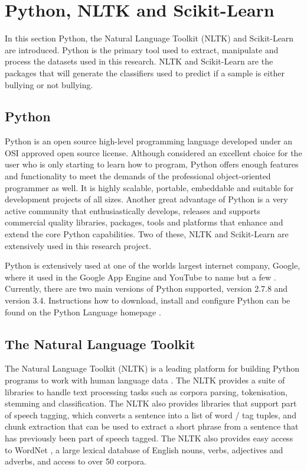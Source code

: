 \section{Python, NLTK and Scikit-Learn}
\label{section:2.2}

In this section Python, the Natural Language Toolkit (NLTK) and Scikit-Learn are introduced. Python is the primary tool used to extract, manipulate and process the datasets used in this research. NLTK and Scikit-Learn are the packages that will generate the classifiers used to predict if a sample is either bullying or not bullying.

\subsection{Python}

Python is an open source high-level programming language developed under an OSI approved open source license. Although considered an excellent choice for the user who is only starting to learn how to program, Python offers enough features and functionality to meet the demands of the professional object-oriented programmer as well. It is highly scalable, portable, embeddable and suitable for development projects of all sizes. Another great advantage of Python is a very active community that enthusiastically develops, releases and supports commercial quality libraries, packages, tools and platforms that enhance and extend the core Python capabilities. Two of these, NLTK and Scikit-Learn are extensively used in this research project. 

Python is extensively used at one of the worlds largest internet company, Google, where it used in the Google App Engine and YouTube to name but a few \cite{google_python}. Currently, there are two main versions of Python supported, version 2.7.8 and version 3.4. Instructions how to download, install and configure Python can be found on the Python Language homepage \cite{python}.

\subsection{The Natural Language Toolkit}

The Natural Language Toolkit (NLTK) is a leading platform for building Python programs to work with human language data \cite{nltk}. The NLTK provides a suite of libraries to handle text processing tasks such as corpora parsing, tokenisation, stemming and classification. The NLTK also provides libraries that support part of speech tagging, which converts a sentence into a list of word / tag tuples, and chunk extraction that can be used to extract a short phrase from a sentence that has previously been part of speech tagged. The NLTK also provides easy access to WordNet \cite{miller_wordnet:_1995}, a large lexical database of English nouns, verbs, adjectives and adverbs, and  access to over 50 corpora.

